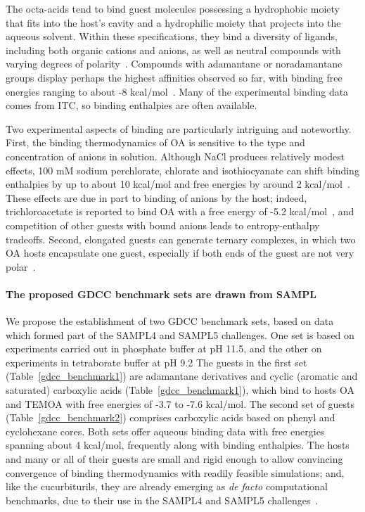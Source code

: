 \documentclass[aps,pre,twocolumn,nofootinbib,superscriptaddress,10pt, final,tightenlines]{revtex4-1}
\begin{document}
The octa-acids tend to bind guest molecules possessing a hydrophobic moiety that fits into the host's cavity and a hydrophilic moiety that projects into the aqueous solvent.  
Within these specifications, they bind a diversity of ligands, including both organic cations and anions, as well as neutral compounds with varying degrees of polarity~\cite{gibb_guests_2009, gibb_binding_2013}.  
Compounds with adamantane or noradamantane groups display perhaps the highest affinities observed so far, with binding free energies ranging to about -8 kcal/mol~\cite{sun_calorimetric_2008}.  
Many of the experimental binding data comes from ITC, so binding enthalpies are often available. 

Two experimental aspects of binding are particularly intriguing and noteworthy. 
First, the binding thermodynamics of OA is sensitive to the type and concentration of anions in solution. 
Although NaCl produces relatively modest effects, 100 mM sodium perchlorate, chlorate and isothiocyanate can shift binding enthalpies by up to about 10 kcal/mol and free energies by around 2 kcal/mol~\cite{gibb_anion_2011}. 
These effects are due in part to binding of anions by the host; indeed, trichloroacetate is reported to bind OA with a free energy of -5.2 kcal/mol~\cite{sokkalingam_binding_2016}, and competition of other guests with bound anions leads to entropy-enthalpy tradeoffs. 
Second, elongated guests can generate ternary complexes, in which two OA hosts encapsulate one guest, especially if both ends of the guest are not very polar~\cite{gibb_guests_2009}.  

\paragraph{The proposed GDCC benchmark sets are drawn from SAMPL}
We propose the establishment of two GDCC benchmark sets, based on data which formed part of the SAMPL4 and SAMPL5 challenges.
One set is based on experiments carried out in phosphate buffer at pH 11.5, and the other on experiments in tetraborate buffer at pH 9.2
The guests in the first set (Table~\ref{gdcc_benchmark1}) are adamantane derivatives and cyclic (aromatic and saturated) carboxylic acids (Table~\ref{gdcc_benchmark1}), which bind to hosts OA and TEMOA with free energies of -3.7 to -7.6 kcal/mol.
The second set of guests (Table~\ref{gdcc_benchmark2}) comprises carboxylic acids based on phenyl and cyclohexane cores.
Both sets offer aqueous binding data with free energies spanning about 4 kcal/mol, frequently along with binding enthalpies.
The hosts and many or all of their guests are small and rigid enough to allow convincing convergence of binding thermodynamics with readily feasible simulations; and, like the cucurbiturils, they are already emerging as \emph{de facto} computational benchmarks, due to their use in the SAMPL4 and SAMPL5 challenges~\cite{muddana_sampl4_2014, yin_overview_2016}. 
\end{document}
